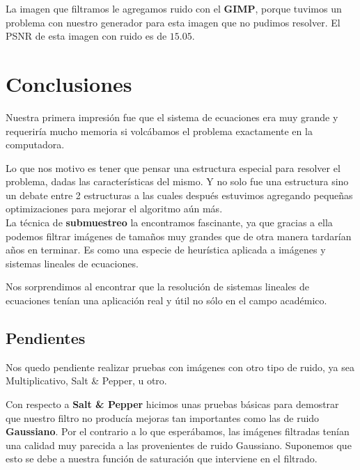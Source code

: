 \documentclass[a4paper]{article}
\begin{document}
La imagen que filtramos le agregamos ruido con el \textbf{GIMP}, porque tuvimos un problema con nuestro generador para esta imagen que no pudimos resolver. El PSNR de esta imagen con ruido es de $15.05$.




\newpage

\section{Conclusiones}
Nuestra primera impresión fue que el sistema de ecuaciones era muy grande y requeriría mucho memoria si volcábamos el problema exactamente en la computadora.

Lo que nos motivo es tener que pensar una estructura especial para resolver el problema, dadas las características del mismo. Y no solo fue una estructura sino un debate entre 2 estructuras a las cuales después estuvimos agregando pequeñas optimizaciones para mejorar el algoritmo aún más. \\ 

La técnica de \textbf{submuestreo} la encontramos fascinante, ya que gracias a ella podemos filtrar imágenes de tamaños muy grandes que de otra manera tardarían años en terminar. Es como una especie de heurística aplicada a imágenes y sistemas lineales de ecuaciones.

Nos sorprendimos al encontrar que la resolución de sistemas lineales de ecuaciones tenían una aplicación real y útil no sólo en el campo académico. 

\subsection{Pendientes}
Nos quedo pendiente realizar pruebas con imágenes con otro tipo de ruido, ya sea Multiplicativo, Salt \& Pepper, u otro.

Con respecto a \textbf{Salt \& Pepper} hicimos unas pruebas básicas para demostrar que nuestro filtro no producía mejoras tan importantes como las de ruido \textbf{Gaussiano}. Por el contrario a lo que esperábamos, las imágenes filtradas tenían una calidad muy parecida a las provenientes de ruido Gaussiano. Suponemos que esto se debe a nuestra función de saturación que interviene en el filtrado.
\end{document}
